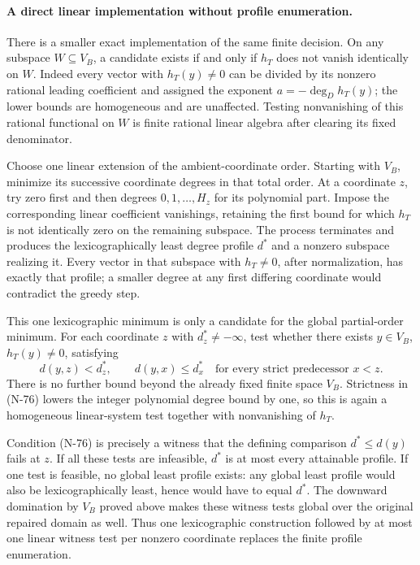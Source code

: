 \paragraph{A direct linear implementation without profile enumeration.}
There is a smaller exact implementation of the same finite
decision.  On any subspace $W\subseteq V_B$, a candidate
exists if and only if $h_T$ does not vanish identically on
$W$.  Indeed every vector with $h_T(y)\ne0$ can be divided
by its nonzero rational leading coefficient and assigned
the exponent $a=-\deg_D h_T(y)$; the lower bounds are
homogeneous and are unaffected.  Testing nonvanishing of
this rational functional on $W$ is finite rational linear
algebra after clearing its fixed denominator.

Choose one linear extension of the ambient-coordinate order.
Starting with $V_B$, minimize its successive coordinate
degrees in that total order.  At a coordinate $z$, try zero
first and then degrees $0,1,\ldots,H_z$ for its polynomial
part.  Impose the corresponding linear coefficient
vanishings, retaining the first bound for which $h_T$ is
not identically zero on the remaining subspace.  The process
terminates and produces the lexicographically least degree
profile $d^*$ and a nonzero subspace realizing it.  Every
vector in that subspace with $h_T\ne0$, after normalization,
has exactly that profile; a smaller degree at any first
differing coordinate would contradict the greedy step.

This one lexicographic minimum is only a candidate for the
global partial-order minimum.  For each coordinate $z$ with
$d^*_z\ne-\infty$, test whether there exists $y\in V_B$,
$h_T(y)\ne0$, satisfying
\[
 d(y,z)<d^*_z,\qquad
 d(y,x)\le d^*_x\quad\text{for every strict predecessor }x<z.
 \tag{N-76}
\]
There is no further bound beyond the already fixed finite
space $V_B$.  Strictness in (N-76) lowers the integer
polynomial degree bound by one, so this is again a
homogeneous linear-system test together with nonvanishing
of $h_T$.

Condition (N-76) is precisely a witness that the defining
comparison $d^*\le d(y)$ fails at $z$.  If all these tests
are infeasible, $d^*$ is at most every attainable profile.
If one test is feasible, no global least profile exists:
any global least profile would also be lexicographically
least, hence would have to equal $d^*$.  The downward
domination by $V_B$ proved above makes these witness tests
global over the original repaired domain as well.  Thus
one lexicographic construction followed by at most one
linear witness test per nonzero coordinate replaces the
finite profile enumeration.


